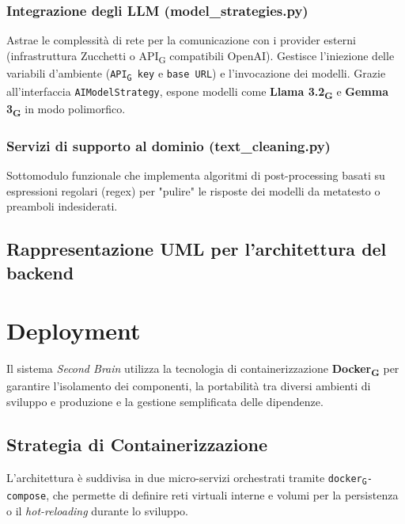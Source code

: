 \documentclass[11pt,a4paper]{article}
\newcommand{\gls}[1]{#1\textsubscript{G}}
\begin{document}
\subsubsection{Integrazione degli LLM (model\_strategies.py)}
Astrae le complessità di rete per la comunicazione con i provider esterni (infrastruttura Zucchetti o \gls{API} compatibili OpenAI). Gestisce l'iniezione delle variabili d'ambiente (\texttt{\gls{API} key} e \texttt{base URL}) e l'invocazione dei modelli. Grazie all'interfaccia \texttt{AIModelStrategy}, espone modelli come \textbf{\gls{Llama 3.2}} e \textbf{\gls{Gemma 3}} in modo polimorfico.

\subsubsection{Servizi di supporto al dominio (text\_cleaning.py)}
Sottomodulo funzionale che implementa algoritmi di post-processing basati su espressioni regolari (regex) per "pulire" le risposte dei modelli da metatesto o preamboli indesiderati.


\subsection{Rappresentazione UML per l'architettura del backend}

\newpage

\section{Deployment}
Il sistema \textit{Second Brain} utilizza la tecnologia di containerizzazione \textbf{\gls{Docker}} per garantire l'isolamento dei componenti, la portabilità tra diversi ambienti di sviluppo e produzione e la gestione semplificata delle dipendenze.

\subsection{Strategia di Containerizzazione}
L'architettura è suddivisa in due micro-servizi orchestrati tramite \texttt{\gls{docker}-compose}, che permette di definire reti virtuali interne e volumi per la persistenza o il \textit{hot-reloading} durante lo sviluppo.
\end{document}
